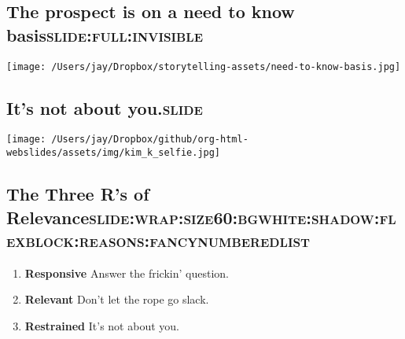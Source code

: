 \documentclass[11pt]{article}
\begin{document}
\subsection{The prospect is on a need to know basis\hfill{}\textsc{slide:full:invisible}}
\label{sec:org24e30f4}
\begin{center}
\texttt{[image: /Users/jay/Dropbox/storytelling-assets/need-to-know-basis.jpg]}
\end{center}

\subsection{It's not about you.\hfill{}\textsc{slide}}
\label{sec:org88ed73e}
\begin{center}
\texttt{[image: /Users/jay/Dropbox/github/org-html-webslides/assets/img/kim\_k\_selfie.jpg]}
\end{center}

\subsection{The Three R's of Relevance\hfill{}\textsc{slide:wrap:size60:bgwhite:shadow:flexblock:reasons:fancynumberedlist}}
\label{sec:org68f37b6}
\begin{enumerate}
\item \textbf{Responsive} Answer the frickin' question.
\item \textbf{Relevant} Don't let the rope go slack.
\item \textbf{Restrained} It's not about you.
\end{enumerate}
\end{document}
